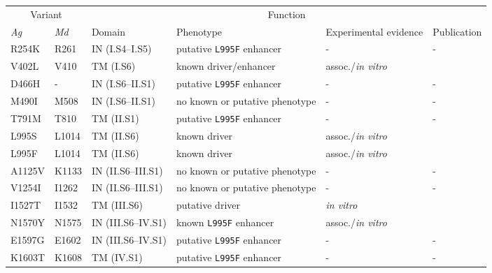 
\begin{tabular}{llllll}
\toprule
\multicolumn{2}{c}{Variant} &
\multicolumn{4}{c}{Function}\\
\cmidrule(r){1-2}
\cmidrule(r){3-6}
\emph{Ag} & 
\emph{Md} & Domain\tnote{1} & 
Phenotype\tnote{2} &
Experimental evidence\tnote{3} &
Publication\\
\midrule

R254K & R261 & IN (I.S4--I.S5) & putative \texttt{L995F} enhancer & - & - \\

V402L & V410 & TM (I.S6) & known driver/enhancer & assoc./\emph{in vitro} & \cite{Yoon2008,Hopkins2010,Park1997,Lee2013,Haddi2017} \\

D466H & - & IN (I.S6--II.S1) & putative \texttt{L995F} enhancer & - & - \\

M490I & M508 & IN (I.S6--II.S1) & no known or putative phenotype & - & - \\

T791M & T810 & TM (II.S1) & putative \texttt{L995F} enhancer & - & - \\

L995S & L1014 & TM (II.S6) & known driver & assoc./\emph{in vitro} & \cite{Burton2011} \\

L995F & L1014 & TM (II.S6) & known driver & assoc./\emph{in vitro} & \cite{Burton2011} \\

A1125V & K1133 & IN (II.S6--III.S1) & no known or putative phenotype & - & - \\

V1254I & I1262 & IN (II.S6--III.S1) & no known or putative phenotype & - & - \\

I1527T & I1532 & TM (III.S6) & putative driver\tnote{4} & \emph{in vitro} & \cite{Haddi2017} \\

N1570Y & N1575 & IN (III.S6--IV.S1) &  known \texttt{L995F} enhancer & assoc./\emph{in vitro} & \cite{Jones2012,Wang2015} \\

E1597G & E1602 & IN (III.S6--IV.S1) & putative \texttt{L995F} enhancer & - & - \\

K1603T & K1608 & TM (IV.S1) & putative \texttt{L995F} enhancer & - & - \\


\end{tabular}
